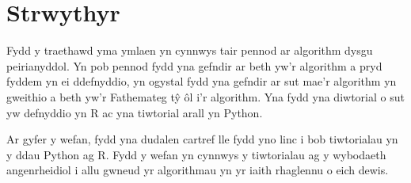\section{Strwythyr}

Fydd y traethawd yma ymlaen yn cynnwys tair pennod ar algorithm dysgu peirianyddol. Yn pob pennod fydd yna gefndir ar beth yw'r algorithm a pryd fyddem yn ei ddefnyddio, yn ogystal fydd yna gefndir ar sut mae'r algorithm yn gweithio a beth yw'r Fathemateg t\^{y} \^{o}l i'r algorithm. Yna fydd yna diwtorial o sut yw defnyddio yn R ac yna tiwtorial arall yn Python.

Ar gyfer y wefan, fydd yna dudalen cartref lle fydd yno linc i bob tiwtorialau yn y ddau Python ag R. Fydd y wefan yn cynnwys y tiwtorialau ag y wybodaeth angenrheidiol i allu gwneud yr algorithmau yn yr iaith rhaglennu o eich dewis.

